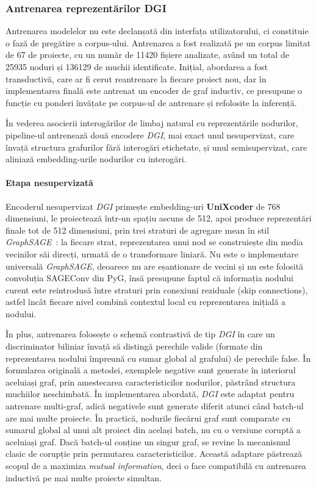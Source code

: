 \documentclass[12pt]{article}
\numberwithin{equation}{section}
\numberwithin{figure}{section}
\numberwithin{table}{section}
\theoremstyle{definition}
\theoremstyle{plain}
\begin{document}
\subsubsection{Antrenarea reprezentărilor DGI}

Antrenarea modelelor nu este declanșată din interfața utilizatorului, ci constituie o fază de pregătire a corpus-ului. Antrenarea a fost realizată pe un corpus limitat de 67 de proiecte, cu un număr de 11420 fișiere analizate, având un total de 25935 noduri și 136129 de muchii identificate. Inițial, abordarea a fost transductivă, care ar fi cerut reantrenare la fiecare proiect nou, dar în implementarea finală este antrenat un encoder de graf inductiv, ce presupune o funcție cu ponderi învățate pe corpus-ul de antrenare și refolosite la inferență.

În vederea asocierii interogărilor de limbaj natural cu reprezentările nodurilor, pipeline-ul antrenează două encodere \textit{DGI}, mai exact unul nesupervizat, care învață structura grafurilor fără interogări etichetate, și unul semisupervizat, care aliniază embedding-urile nodurilor cu interogări.

\paragraph{Etapa nesupervizată}

Encoderul nesupervizat \textit{DGI} primește embedding-uri \textbf{UniXcoder} de 768 dimensiuni, le proiectează într-un spațiu ascuns de 512, apoi produce reprezentări finale tot de 512 dimensiuni, prin trei straturi de agregare mean în stil \textit{GraphSAGE}~\cite{hamilton2017graphsage}: la fiecare strat, reprezentarea unui nod se construiește din media vecinilor săi direcți, urmată de o transformare liniară. Nu este o implementare universală \textit{GraphSAGE}, deoarece nu are eșantionare de vecini și nu este folosită convoluția SAGEConv din PyG, însă presupune faptul că informația nodului curent este reintrodusă între straturi prin conexiuni reziduale (skip connections), astfel încât fiecare nivel combină contextul local cu reprezentarea inițială a nodului.

În plus, antrenarea folosește o schemă contrastivă de tip \textit{DGI} în care un discriminator biliniar învață să distingă perechile valide (formate din reprezentarea nodului împreună cu sumar global al grafului) de perechile false. În formularea originală a metodei, exemplele negative sunt generate în interiorul aceluiași graf, prin amestecarea caracteristicilor nodurilor, păstrând structura muchiilor neschimbată. În implementarea abordată, \textit{DGI} este adaptat pentru antrenare multi-graf, adică negativele sunt generate diferit atunci când batch-ul are mai multe proiecte. În practică, nodurile fiecărui graf sunt comparate cu sumarul global al unui alt proiect din același batch, nu cu o versiune coruptă a aceluiași graf. Dacă batch-ul conține un singur graf, se revine la mecanismul clasic de corupție prin permutarea caracteristicilor. Această adaptare păstrează scopul de a maximiza \textit{mutual information}, deci o face compatibilă cu antrenarea inductivă pe mai multe proiecte simultan.
\end{document}
